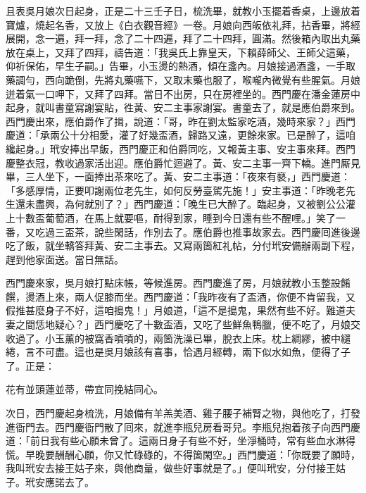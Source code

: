 且表吳月娘次日起身，正是二十三壬子日，梳洗畢，就教小玉擺着香桌，上邊放着寶爐，燒起名香，又放上《白衣觀音經》一卷。月娘向西皈依礼拜，拈香畢，將經展開，念一遍，拜一拜，念了二十四遍，拜了二十四拜，圓滿。然後箱內取出丸藥放在桌上，又拜了四拜，禱告道：「我吳氏上靠皇天，下賴薛師父、王師父這藥，{}仰祈保佑，早生子嗣。」告畢，小玉燙的熱酒，傾在盞內。月娘接過酒盞，一手取藥調勻，西向跪倒，先將丸藥嚥下，又取末藥也服了，喉嚨內微覺有些腥氣。{}月娘迸着氣一口呷下，{}又拜了四拜。當日不出房，只在房裡坐的。西門慶在潘金蓮房中起身，就叫書童寫謝宴貼，徃黃、安二主事家謝宴。書童去了，就是應伯爵來到。西門慶出來，應伯爵作了揖，說道：「哥，昨在劉太監家吃酒，幾時來家？」西門慶道：「承兩公十分相愛，灌了好幾盃酒，歸路又遠，更餘來家。已是醉了，這咱纔起身。」玳安捧出早飯，西門慶正和伯爵同吃，又報黃主事、安主事來拜。西門慶整衣冠，教收過家活出迎。應伯爵忙迴避了。黃、安二主事一齊下轎。進門厮見畢，三人坐下，一面捧出茶來吃了。黃、安二主事道：「夜來有褻，」西門慶道：「多感厚情，正要叩謝兩位老先生，如何反勞臺駕先施！」安主事道：「昨晚老先生還未盡興，為何就別了？」西門慶道：「晚生已大醉了。臨起身，又被劉公公灌上十數盃葡萄酒，在馬上就要嘔，耐得到家，睡到今日還有些不醒哩。」笑了一番，又吃過三盃茶，說些閑話，作別去了。應伯爵也推事故家去。西門慶囘進後邊吃了飯，就坐轎答拜黃、安二主事去。又寫兩箇紅礼帖，分付玳安備辦兩副下程，趕到他家面送。當日無話。

西門慶來家，吳月娘打點床帳，等候進房。西門慶進了房，月娘就教小玉整設餚饌，燙酒上來，兩人促膝而坐。西門慶道：「我昨夜有了盃酒，你便不肯留我，又假推甚麼身子不好，這咱搗鬼！」月娘道，「這不是搗鬼，果然有些不好。難道夫妻之間恁地疑心？」西門慶吃了十數盃酒，又吃了些鮮魚鴨臘，便不吃了，月娘交收過了。小玉薰的被窩香噴噴的，兩箇洗澡已畢，脫衣上床。枕上綢繆，被中繾綣，言不可盡。這也是吳月娘該有喜事，恰遇月經轉，兩下似水如魚，便得了子了。{}正是：

\begin{myquote}
花有並頭蓮並蒂，帶宜同挽結同心。
\end{myquote}

次日，西門慶起身梳洗，月娘備有羊羔美酒、雞子腰子補腎之物，與他吃了，打發進衙門去。西門慶衙門散了囘來，就進李瓶兒房看哥兒。李瓶兒抱着孩子向西門慶道：「前日我有些心願未曾了。這兩日身子有些不好，坐淨桶時，常有些血水淋得慌。早晚要酬酬心願，你又忙碌碌的，不得箇閑空。」西門慶道：「你既要了願時，我叫玳安去接王姑子來，{}與他商量，做些好事就是了。」便叫玳安，分付接王姑子。玳安應諾去了。

